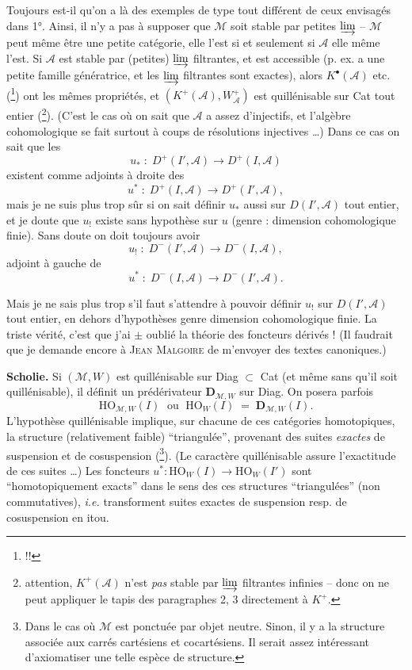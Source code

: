 \documentclass[11pt]{article}
\newcommand{\printedpage}[1]{\marginpar{\footnotesize p.~#1}}
\newcommand{\msp}[1]{\marginpar{\footnotesize [#1]}}
\begin{document}
\msp{page 53}Toujours est-il qu'on a là des exemples de type tout différent de ceux envisagés dans 1°. Ainsi, il n'y a pas à supposer que $\mathcal{M}$ soit stable par petites $\varinjlim$ -- $\mathcal{M}$ peut même être une petite catégorie, elle l'est si et seulement si $\mathcal{A}$ elle même l'est. Si $\mathcal{A}$ est stable par (petites) $\varinjlim$ filtrantes, et est accessible (p. ex. a une petite famille génératrice, et les $\varinjlim$ filtrantes sont exactes), alors $K^{\bullet}(\mathcal{A})$ etc. (\footnote[30]{!!}) ont les mêmes propriétés, et $(K^{+}(\mathcal{A}),W_{\mathcal{A}}^{+})$ est quillénisable sur Cat tout entier (\footnote[31]{attention, $K^{+}(\mathcal{A})$ n'est \textit{pas} stable par $\varinjlim$ filtrantes infinies -- donc on ne peut appliquer le tapis des paragraphes 2, 3 directement à $K^{+}$.}). (C'est le cas où on sait que $\mathcal{A}$ a assez d'injectifs, et l'algèbre cohomologique se fait surtout à coups de résolutions injectives \dots) Dans ce cas on sait que les %
\[ u_{*} \;:\; D^{+}(I',\mathcal{A}) \longrightarrow D^{+}(I,\mathcal{A}) \]
existent comme adjoints à droite des
\[ u^{*} \;:\; D^{+}(I,\mathcal{A}) \longrightarrow D^{+}(I',\mathcal{A}), \]
mais je ne suis plus trop sûr si on sait définir $u_{*}$ aussi sur $D(I',\mathcal{A})$ tout entier, et je doute que $u_{!}$ existe sans hypothèse sur $u$ (genre : dimension cohomologique finie). Sans doute on doit toujours avoir
\[ u_{!} \;:\; D^{-}(I',\mathcal{A}) \longrightarrow D^{-}(I,\mathcal{A}), \]
\msp{page 54}adjoint à gauche de
\[ u^{*} \;:\; D^{-}(I,\mathcal{A}) \longrightarrow D^{-}(I',\mathcal{A}). \]

\printedpage{31}
Mais je ne sais plus trop s'il faut s'attendre à pouvoir définir $u_{!}$ sur $D(I',\mathcal{A})$ tout entier, en dehors d'hypothèses genre dimension cohomologique finie. La triste vérité, c'est que j'ai $\pm$ oublié la théorie des foncteurs dérivés ! (Il faudrait que je demande encore à \textsc{Jean Malgoire} de m'envoyer des textes canoniques.)

\textbf{Scholie.} Si $(\mathcal{M},W)$ est quillénisable sur Diag $\subset$ Cat (et même sans qu'il soit quillénisable), il définit un prédérivateur $\mathbf{D}_{\mathcal{M},W}$ sur Diag. On posera parfois
\[ \mathrm{HO}_{\mathcal{M},W}(I) \;\text{ ou }\; \mathrm{HO}_{W}(I) \;=\; \mathbf{D}_{\mathcal{M},W}(I). \]
L'hypothèse quillénisable implique, sur chacune de ces catégories homotopiques, la structure (relativement faible) ``triangulée'', provenant des suites \textit{exactes} de suspension et de cosuspension (\footnote[32]{Dans le cas où $\mathcal{M}$ est ponctuée par objet neutre. Sinon, il y a la structure associée aux carrés cartésiens et cocartésiens. Il serait assez intéressant d'axiomatiser une telle espèce de structure.}). (Le caractère quillénisable assure l'exactitude de ces suites \dots) Les foncteurs $u^{*} : \mathrm{HO}_{W}(I) \longrightarrow \mathrm{HO}_{W}(I')$
\msp{page 55}sont ``homotopiquement exacts'' dans le sens des ces structures ``triangulées'' (non commutatives), \textit{i.e.} transforment suites exactes de suspension resp. de cosuspension en itou. %
\end{document}
